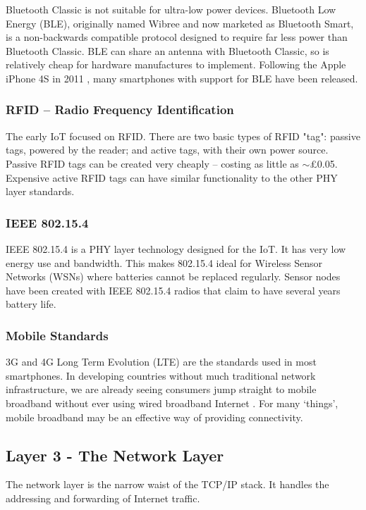 \documentclass[10pt,journal,compsoc]{IEEEtran}
\begin{document}
Bluetooth Classic is not suitable for ultra-low power devices. Bluetooth Low
Energy (BLE), originally named Wibree and now marketed as Bluetooth Smart, is a
non-backwards compatible protocol designed to require far less power than
Bluetooth Classic. BLE can share an antenna with Bluetooth Classic, so is
relatively cheap for hardware manufactures to implement. Following the Apple
iPhone 4S in 2011 \cite{Engadget2011}, many smartphones with support for BLE
have been released.

\subsubsection{RFID -- Radio Frequency Identification}
The early IoT focused on RFID. There are two basic types of RFID "tag": passive
tags, powered by the reader; and active tags, with their own power source.
Passive RFID tags can be created very cheaply -- costing as little as
$\sim$\pounds0.05. Expensive active RFID tags can have similar functionality
to the other PHY layer standards. 

\subsubsection{IEEE 802.15.4}
IEEE 802.15.4 is a PHY layer technology designed for the IoT. It has very low
energy use and bandwidth. This makes 802.15.4 ideal for Wireless Sensor
Networks (WSNs) where batteries cannot be replaced regularly. Sensor nodes have
been created with IEEE 802.15.4 radios that claim to have several years battery
life.  

\subsubsection{Mobile Standards}
3G and 4G Long Term Evolution (LTE) are the standards used in most smartphones.
In developing countries without much traditional network infrastructure, we are
already seeing consumers jump straight to mobile broadband without ever using
wired broadband Internet \cite{Kritzinger2013}. For many `things', mobile
broadband may be an effective way of providing connectivity.  

\subsection{Layer 3 - The Network Layer}
The network layer is the narrow waist of the TCP/IP stack. It handles
the addressing and forwarding of Internet traffic. 
\end{document}
